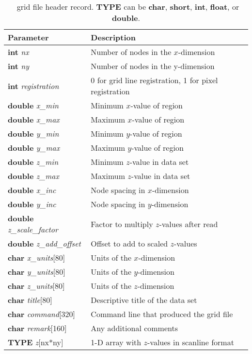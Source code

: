 \begin{table}
\centering
\begin{tabular}{ll} \hline
\textbf{Parameter} & \textbf{Description} \\ \hline\hline
\textbf{int} \emph{nx} & Number of nodes in the $x$-dimension \\
\textbf{int} \emph{ny} & Number of nodes in the y-dimension \\
\textbf{int} \emph{registration} & 0 for grid line registration, 1 for pixel registration \\
\textbf{double} \emph{x\_min} & Minimum $x$-value of region \\
\textbf{double} \emph{x\_max} & Maximum $x$-value of region \\
\textbf{double} \emph{y\_min} & Minimum $y$-value of region \\
\textbf{double} \emph{y\_max} & Maximum $y$-value of region \\
\textbf{double} \emph{z\_min} & Minimum $z$-value in data set \\
\textbf{double} \emph{z\_max} & Maximum $z$-value in data set \\
\textbf{double} \emph{x\_inc} & Node spacing in $x$-dimension \\
\textbf{double} \emph{y\_inc} & Node spacing in $y$-dimension \\
\textbf{double} \emph{z\_scale\_factor} & Factor to multiply $z$-values after read \\
\textbf{double} \emph{z\_add\_offset} & Offset to add to scaled $z$-values \\
\textbf{char} \emph{x\_units}[80] & Units of the $x$-dimension \\
\textbf{char} \emph{y\_units}[80] & Units of the $y$-dimension \\
\textbf{char} \emph{z\_units}[80] & Units of the $z$-dimension \\
\textbf{char} \emph{title}[80] & Descriptive title of the data set \\
\textbf{char} \emph{command}[320] & Command line that produced the grid file \\
\textbf{char} \emph{remark}[160] & Any additional comments \\
\textbf{TYPE} \emph{z}[nx*ny] & 1-D array with $z$-values in scanline format \\ \hline
\end{tabular}
\caption{\gmt\ grid file header record. \textbf{TYPE} can be \textbf{char}, \textbf{short}, \textbf{int},
\textbf{float}, or {\bf
double}.}
\label{tbl:grdheader}
\end{table}

